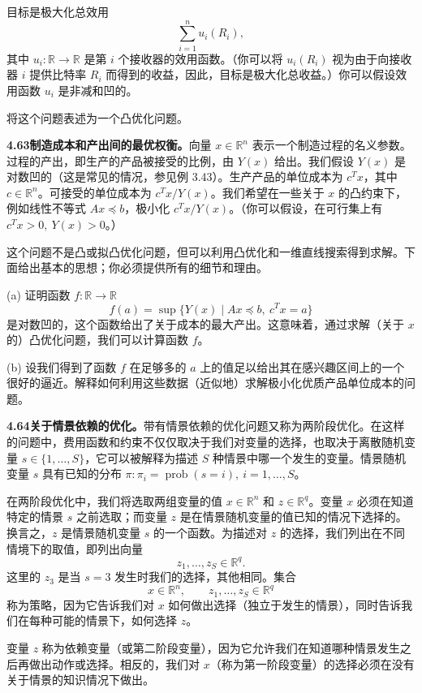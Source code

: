 \documentclass[UTF8, 12pt, fontset=fandol, oneside]{ctexart}
\begin{document}
目标是极大化总效用
\[
\sum_{i=1}^n u_i(R_i),
\]
其中 $u_i:\mathbb{R}\to\mathbb{R}$ 是第 $i$ 个接收器的效用函数。（你可以将 $u_i(R_i)$ 视为由于向接收器 $i$ 提供比特率 $R_i$ 而得到的收益，因此，目标是极大化总收益。）你可以假设效用函数 $u_i$ 是非减和凹的。

将这个问题表述为一个凸优化问题。

\noindent\textbf{4.63\quad 制造成本和产出间的最优权衡。}\quad 向量 $x\in\mathbb{R}^n$ 表示一个制造过程的名义参数。过程的产出，即生产的产品被接受的比例，由 $Y(x)$ 给出。我们假设 $Y(x)$ 是对数凹的（这是常见的情况，参见例 3.43）。生产产品的单位成本为 $c^Tx$，其中 $c\in\mathbb{R}^n$。可接受的单位成本为 $c^Tx/Y(x)$。我们希望在一些关于 $x$ 的凸约束下，例如线性不等式 $Ax\preceq b$，极小化 $c^Tx/Y(x)$。（你可以假设，在可行集上有 $c^Tx>0,\ Y(x)>0$。）

这个问题不是凸或拟凸优化问题，但可以利用凸优化和一维直线搜索得到求解。下面给出基本的思想；你必须提供所有的细节和理由。

(a) 证明函数 $f:\mathbb{R}\to\mathbb{R}$
\[
f(a)=\sup\{Y(x)\mid Ax\preceq b,\ c^Tx=a\}
\]
是对数凹的，这个函数给出了关于成本的最大产出。这意味着，通过求解（关于 $x$ 的）凸优化问题，我们可以计算函数 $f$。

(b) 设我们得到了函数 $f$ 在足够多的 $a$ 上的值足以给出其在感兴趣区间上的一个很好的逼近。解释如何利用这些数据（近似地）求解极小化优质产品单位成本的问题。

\noindent\textbf{4.64\quad 关于情景依赖的优化。}\quad 带有情景依赖的优化问题又称为两阶段优化。在这样的问题中，费用函数和约束不仅仅取决于我们对变量的选择，也取决于离散随机变量 $s\in\{1,\ldots,S\}$，它可以被解释为描述 $S$ 种情景中哪一个发生的变量。情景随机变量 $s$ 具有已知的分布 $\pi:\pi_i=\operatorname{prob}(s=i),\ i=1,\ldots,S$。

在两阶段优化中，我们将选取两组变量的值 $x\in\mathbb{R}^n$ 和 $z\in\mathbb{R}^q$。变量 $x$ 必须在知道特定的情景 $s$ 之前选取；而变量 $z$ 是在情景随机变量的值已知的情况下选择的。换言之，$z$ 是情景随机变量 $s$ 的一个函数。为描述对 $z$ 的选择，我们列出在不同情境下的取值，即列出向量
\[
z_1,\ldots,z_S\in\mathbb{R}^q.
\]
这里的 $z_3$ 是当 $s=3$ 发生时我们的选择，其他相同。集合
\[
x\in\mathbb{R}^n,\qquad z_1,\ldots,z_S\in\mathbb{R}^q
\]
称为策略，因为它告诉我们对 $x$ 如何做出选择（独立于发生的情景），同时告诉我们在每种可能的情景下，如何选择 $z$。

变量 $z$ 称为依赖变量（或第二阶段变量），因为它允许我们在知道哪种情景发生之后再做出动作或选择。相反的，我们对 $x$（称为第一阶段变量）的选择必须在没有关于情景的知识情况下做出。
\end{document}
